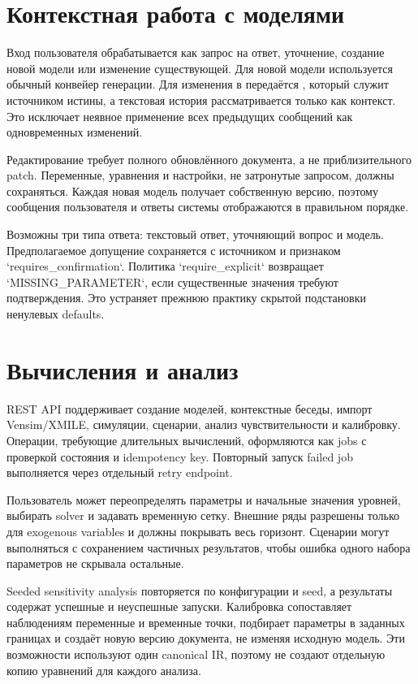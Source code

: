 \section{Контекстная работа с моделями}

Вход пользователя обрабатывается как запрос на ответ, уточнение, создание новой модели или изменение существующей. Для новой модели используется обычный конвейер генерации. Для изменения в  передаётся , который служит источником истины, а текстовая история рассматривается только как контекст. Это исключает неявное применение всех предыдущих сообщений как одновременных изменений.

Редактирование требует полного обновлённого документа, а не приблизительного patch. Переменные, уравнения и настройки, не затронутые запросом, должны сохраняться. Каждая новая модель получает собственную версию, поэтому сообщения пользователя и ответы системы отображаются в правильном порядке.

Возможны три типа ответа: текстовый ответ, уточняющий вопрос и модель. Предполагаемое допущение сохраняется с источником и признаком `requires\_confirmation`. Политика `require\_explicit` возвращает `MISSING\_PARAMETER`, если существенные значения требуют подтверждения. Это устраняет прежнюю практику скрытой подстановки ненулевых defaults.

\section{Вычисления и анализ}

REST API поддерживает создание моделей, контекстные беседы, импорт Vensim/XMILE, симуляции, сценарии, анализ чувствительности и калибровку. Операции, требующие длительных вычислений, оформляются как jobs с проверкой состояния и idempotency key. Повторный запуск failed job выполняется через отдельный retry endpoint.

Пользователь может переопределять параметры и начальные значения уровней, выбирать solver и задавать временную сетку. Внешние ряды разрешены только для exogenous variables и должны покрывать весь горизонт. Сценарии могут выполняться с сохранением частичных результатов, чтобы ошибка одного набора параметров не скрывала остальные.

Seeded sensitivity analysis повторяется по конфигурации и seed, а результаты содержат успешные и неуспешные запуски. Калибровка сопоставляет наблюдениям переменные и временные точки, подбирает параметры в заданных границах и создаёт новую версию документа, не изменяя исходную модель. Эти возможности используют один canonical IR, поэтому не создают отдельную копию уравнений для каждого анализа.


